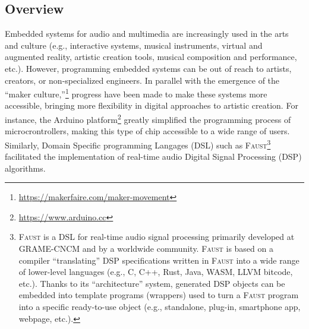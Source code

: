 \documentclass[a4paper,10pt]{article}
\newcommand{\F}{\textsc{Faust}}
\begin{document}


\subsection*{Overview}

Embedded systems for audio and multimedia are increasingly used in the arts and culture (e.g., interactive systems, musical instruments, virtual and augmented reality, artistic creation tools, musical composition and performance, etc.). However, programming embedded systems  can be out of reach to artists, creators, or non-specialized engineers. In parallel with the emergence of the ``maker culture,''\footnote{\url{https://makerfaire.com/maker-movement}} progress have been made to make these systems more accessible, bringing more flexibility in digital approaches to artistic creation. For instance, the Arduino platform\footnote{\url{https://www.arduino.cc}} greatly simplified the programming process of microcrontrollers, making this type of chip accessible to a wide range of users. 
Similarly, Domain Specific programming Langages (DSL) such as \F{}\footnote{\F{} is a DSL for real-time audio signal processing primarily developed at GRAME-CNCM and by a worldwide community. \F{} is based on a compiler ``translating'' DSP specifications written in \F{} into a wide range of lower-level languages (e.g., C, C++, Rust, Java, WASM, LLVM bitcode, etc.). Thanks to its ``architecture'' system, generated DSP objects can be embedded into template programs (wrappers) used to turn a \F{} program into a specific ready-to-use object (e.g., standalone, plug-in, smartphone app, webpage, etc.). } 
\cite{Orlarey2009} facilitated the implementation of real-time audio Digital Signal Processing (DSP) algorithms.
\end{document}
